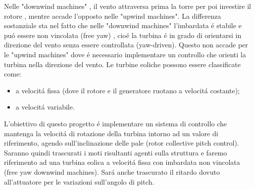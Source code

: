 \documentclass[a4paper,13pt]{article}
\begin{document}
Nelle "downwind machines" , il vento attraversa prima la torre per poi investire il rotore , mentre accade l'opposto nelle "upwind machines".
La differenza sostanziale sta nel fatto che nelle "downwind machines" l'imbardata \'e stabile e pu\'o essere non vincolata (free yaw) , cio\'e la turbina \'e in grado di orientarsi in direzione del vento senza essere controllata (yaw-driven).
Questo non accade per le "upwind machines" dove \'e necessario implementare un controllo che orienti la turbina nella direzione del vento.
Le turbine eoliche possono essere classificate come:
\begin{itemize}
\item a velocit\'a fissa (dove il rotore e il generatore ruotano a velocit\'a costante);
\item a velocit\'a variabile.
\end{itemize}
L'obiettivo di questo progetto \'e implementare un sistema di controllo che mantenga la velocit\'a di rotazione della turbina intorno ad un valore di riferimento, agendo sull'inclinazione delle pale (rotor collective pitch control).
Saranno quindi trascurati i moti risultanti agenti sulla struttura e faremo riferimento ad una turbina eolica a velocit\'a fissa con imbardata non vincolata (free yaw downwind machines).
Sar\'a anche trascurato il ritardo dovuto all'attuatore per le variazioni sull'angolo di pitch.
\end{document}
